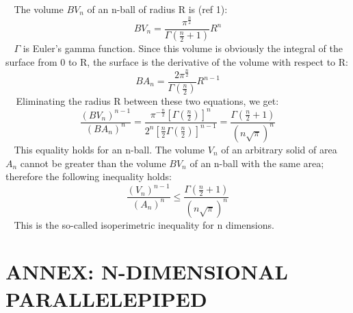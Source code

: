 \documentclass[12pt]{article}
\begin{document}
$~~~~$The volume $BV_n$ of an n-ball of radius R is (ref 1):
$$BV_n=\frac{\pi^{\frac{n}{2}}}{\Gamma\left(\frac{n}{2}+1\right)}R^n$$
$~~~~\Gamma$ is Euler's gamma function. Since this volume is obviously the integral of the surface from 0 to R, the surface is the derivative of the volume with respect to R:
$$BA_n=\frac{2\pi^{\frac{n}{2}}}{\Gamma\left(\frac{n}{2}\right)}R^{n-1}$$
$~~~~~$Eliminating the radius R between these two equations, we get:
$$\frac{\left(BV_n\right)^{n-1}}{\left(BA_n\right)^n}=
\frac{\pi^{-\frac{n}{2}}\left[\Gamma\left(\frac{n}{2}\right)\right]^n}
{2^n\left[\frac{n}{2}\Gamma\left(\frac{n}{2}\right)\right]^{n-1}}=
\frac{\Gamma\left(\frac{n}{2}+1\right)}{\left(n\sqrt{\pi}\right)^n}$$
$~~~~$This equality holds for an n-ball. The volume $V_n$ of an arbitrary solid of area $A_n$ cannot be greater than the volume $BV_n$ of an n-ball with the same area; therefore the following inequality holds:
$$\frac{\left(V_n\right)^{n-1}}{\left(A_n\right)^n}\leq
{\frac{\Gamma\left(\frac{n}{2}+1\right)}{\left(n\sqrt{\pi}\right)^n}}$$
$~~~~$This is the so-called isoperimetric inequality for n dimensions.

\section{ANNEX: N-DIMENSIONAL PARALLELEPIPED}
\end{document}
